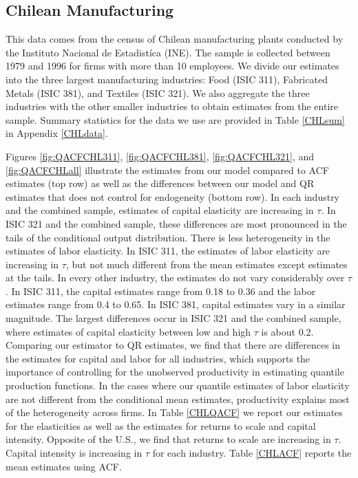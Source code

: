 \documentclass[12pt]{article}
\begin{document}
\subsection{Chilean Manufacturing}
This data comes from the census of Chilean manufacturing plants conducted by the Instituto Nacional de Estadist\'ica (INE). The sample is collected between 1979 and 1996 for firms with more than 10 employees. We divide our estimates into the three largest manufacturing industries: Food (ISIC 311), Fabricated Metals (ISIC 381), and Textiles (ISIC 321). We also aggregate the three industries with the other smaller industries to obtain estimates from the entire sample. Summary statistics for the data we use are provided in Table \ref{CHLsum} in Appendix \ref{CHLdata}.

Figures \ref{fig:QACFCHL311}, \ref{fig:QACFCHL381}, \ref{fig:QACFCHL321}, and  \ref{fig:QACFCHLall} illustrate the estimates from our model compared to ACF estimates (top row) as well as the differences between our model and QR estimates that does not control for endogeneity (bottom row). In each industry and the combined sample, estimates of capital elasticity are increasing in $\tau$. In ISIC 321 and the combined sample, these differences are most pronounced in the tails of the conditional output distribution. There is less heterogeneity in the estimates of labor elasticity. In ISIC 311, the estimates of labor elasticity are increasing in $\tau$, but not much different from the mean estimates except estimates at the tails. In every other industry, the estimates do not vary considerably over $\tau$. In ISIC 311, the capital estimates range from 0.18 to 0.36 and the labor estimates range from 0.4 to 0.65. In ISIC 381, capital estimates vary in a similar magnitude. The largest differences occur in ISIC 321 and the combined sample, where estimates of capital elasticity between low and high $\tau$ is about 0.2. Comparing our estimator to QR estimates, we find that there are differences in the estimates for capital and labor for all industries, which supports the importance of controlling for the unobserved productivity in estimating quantile production functions. In the cases where our quantile estimates of labor elasticity are not different from the conditional mean estimates, productivity explains most of the heterogeneity across firms. In Table \ref{CHLQACF} we report our estimates for the elasticities as well as the estimates for returns to scale and capital intensity. Opposite of the U.S., we find that returns to scale are increasing in $\tau$. Capital intensity is increasing in $\tau$ for each industry. Table \ref{CHLACF} reports the mean estimates using ACF.
\end{document}
